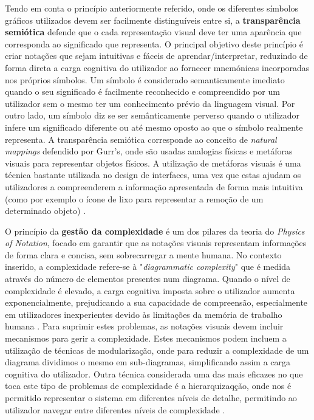 Tendo em conta o princípio anteriormente referido, onde os diferentes símbolos gráficos utilizados devem ser facilmente distinguíveis entre si, a \textbf{transparência semiótica} defende que o cada representação visual deve ter uma aparência que corresponda ao significado que representa. O principal objetivo deste princípio é criar notações que sejam intuitivas e fáceis de aprendar/interpretar, reduzindo de forma direta a carga cognitiva do utilizador ao fornecer mnemónicas incorporadas nos próprios símbolos. Um símbolo é considerado semanticamente imediato quando o seu significado é facilmente reconhecido e compreendido por um utilizador sem o mesmo ter um conhecimento prévio da linguagem visual. Por outro lado, um símbolo diz se ser semânticamente perverso quando o utilizador infere um significado diferente ou até mesmo oposto ao que o símbolo realmente representa. A transparência semiótica corresponde ao conceito de \textit{natural mappings} defendido por Gurr's, onde são usadas analogias físicas e metáforas visuais para representar objetos físicos. A utilização de metáforas visuais é uma técnica bastante utilizada no design de interfaces, uma vez que estas ajudam os utilizadores a compreenderem a informação apresentada de forma mais intuitiva (como por exemplo o ícone de lixo para representar a remoção de um determinado objeto) \cite{moody2009physics}.

O princípio da \textbf{gestão da complexidade} é um dos pilares da teoria do \textit{Physics of Notation}, focado em garantir que as notações visuais representam informações de forma clara e concisa, sem sobrecarregar a mente humana. No contexto inserido, a complexidade refere-se à "\textit{diagrammatic complexity}" que é medida através do número de elementos presentes num diagrama. Quando o nível de complexidade é elevado, a carga cognitiva imposta sobre o utilizador aumenta exponencialmente, prejudicando a sua capacidade de compreensão, especialmente em utilizadores inexperientes devido às limitações da memória de trabalho humana \cite{sweller1988cognitive}. Para suprimir estes problemas, as notações visuais devem incluir mecanismos para gerir a complexidade. Estes mecanismos podem incluem a utilização de técnicas de modularização, onde para reduzir a complexidade de um diagrama dividimos o mesmo em sub-diagramas, simplificando assim a carga cognitiva do utilizador. Outra técnica considerada uma das mais eficazes no que toca este tipo de problemas de complexidade é a hierarquizaqção, onde nos é permitido representar o sistema em diferentes níveis de detalhe, permitindo ao utilizador navegar entre diferentes níveis de complexidade \cite{moody2009physics}. 

